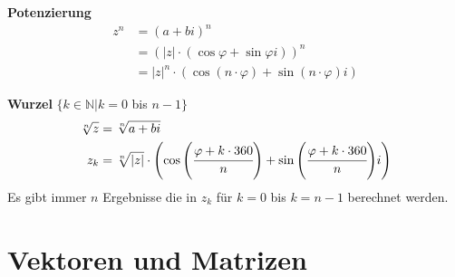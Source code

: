 \documentclass[german]{latex4ei/latex4ei_sheet}
\begin{document}
\begin{sectionbox}
\textbf{Potenzierung}
\begin{align*}
{ z }^{ n } &={ \left( a+bi \right)  }^{ n } \\
&={ \left( \left| z \right| \cdot \left( \cos { \varphi  } +\sin { \varphi  } i \right)  \right)  }^{ n } \\
&={ \left| z \right|  }^{ n }\cdot \left( \cos { \left( n\cdot \varphi  \right)  } +\sin { \left( n\cdot \varphi  \right)  } i \right)
\end{align*}

\textbf{Wurzel} $\lbrace k \in \mathbb{N}  \vert k = 0$ bis $n-1 \rbrace$
\begin{align*}
\sqrt[n]{z} &= \sqrt[n]{ a+bi } \\
{ z }_{ k } &= \sqrt[n]{\vert z \vert} \cdot \left( \cos{ \left( \cfrac{ \varphi + k \cdot 360}{n} \right) } +\sin{\left( \cfrac{\varphi + k \cdot 360}{n} \right)} i \right) 
\end{align*}
Es gibt immer $n$ Ergebnisse die in ${ z }_{ k } $ für $k= 0$ bis $k= n-1$ berechnet werden.

\end{sectionbox}

\section{Vektoren und Matrizen}
\end{document}
